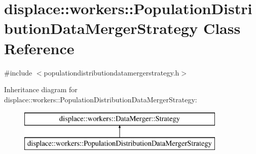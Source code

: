 \hypertarget{classdisplace_1_1workers_1_1_population_distribution_data_merger_strategy}{}\section{displace\+::workers\+::Population\+Distribution\+Data\+Merger\+Strategy Class Reference}
\label{classdisplace_1_1workers_1_1_population_distribution_data_merger_strategy}


{\ttfamily \#include $<$populationdistributiondatamergerstrategy.\+h$>$}

Inheritance diagram for displace\+::workers\+::Population\+Distribution\+Data\+Merger\+Strategy\+:\begin{figure}[H]
\begin{center}
\leavevmode
\includegraphics[height=2.000000cm]{d8/d36/classdisplace_1_1workers_1_1_population_distribution_data_merger_strategy}
\end{center}
\end{figure}
